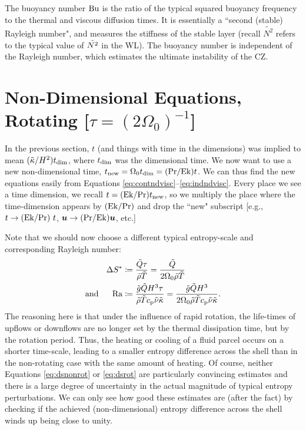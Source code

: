 \documentclass[12pt]{article}
\numberwithin{equation}{section}
\begin{document}
The buoyancy number ${\rm{Bu}}$ is the ratio of the typical squared buoyancy frequency to the thermal and viscous diffusion times. It is essentially a ``second (stable) Rayleigh number", and measures the stiffness of the stable layer (recall $\widetilde{N^2}$ refers to the typical value of $\tilde{N^2}$ in the WL). The buoyancy number is independent of the Rayleigh number, which estimates the ultimate instability of the CZ. 

\section{Non-Dimensional Equations, Rotating [$\tau=(2\Omega_0)^{-1}$]}
In the previous section, $t$ (and things with time in the dimensions) was implied to mean $(\tilde{\kappa}/H^2) t_{\rm{dim}}$, where $t_{\rm{dim}}$ was the dimensional time. We now want to use a new non-dimensional time, $t_{\rm{new}}= \Omega_0t_{\rm{dim}} = ({\rm{Pr}}/{\rm{Ek}})t$. We can thus find the new equations easily from Equations \eqref{eq:contndvisc}--\eqref{eq:indndvisc}. Every place we see a time dimension, we recall $t=({\rm{Ek}} /{\rm{Pr}})t_{\rm{new}}$, so we multiply the place where the time-dimension appears by $({\rm{Ek}}/{\rm{Pr}})$ and drop the ``new" subscript [e.g., $t\rightarrow ({\rm{Ek}}/{\rm{Pr}})\ t$, $\bm{u}\rightarrow({\rm{Pr}}/{\rm{Ek}})\bm{u}$, etc.]  

Note that we should now choose a different typical entropy-scale and corresponding Rayleigh number:
\begin{subequations}
	\begin{align}
		\Delta S^*&\coloneqq \frac{\tilde{Q}\tau}{\tilde{\rho}\tilde{T}} = \frac{\tilde{Q}}{2\Omega_0\tilde{\rho}\tilde{T}}\label{eq:dsrot}\\
		\text{and}\ \ \ \ \  {\rm{Ra}} &\coloneqq \frac{\tilde{g} \tilde{Q} H^3\tau}{\tilde{\rho}\tilde{T}c_{\rm{p}}\tilde{\nu} \tilde{\kappa}} =  \frac{\tilde{g} \tilde{Q} H^3}{2\Omega_0\tilde{\rho}\tilde{T}c_{\rm{p}}\tilde{\nu} \tilde{\kappa}}.\label{eq:rarot}
	\end{align}
\end{subequations}
The reasoning here is that under the influence of rapid rotation, the life-times of upflows or downflows are no longer set by the thermal dissipation time, but by the rotation period. Thus, the heating or cooling of a fluid parcel occurs on a shorter time-scale, leading to a smaller entropy difference across the shell than in the non-rotating case with the same amount of heating. Of course, neither Equations \eqref{eq:dsnonrot} or \eqref{eq:dsrot} are particularly convincing estimates and there is a large degree of uncertainty in the actual magnitude of typical entropy perturbations. We can only see how good these estimates are (after the fact) by checking if the achieved (non-dimensional) entropy difference across the shell winds up being close to unity. 
\end{document}

